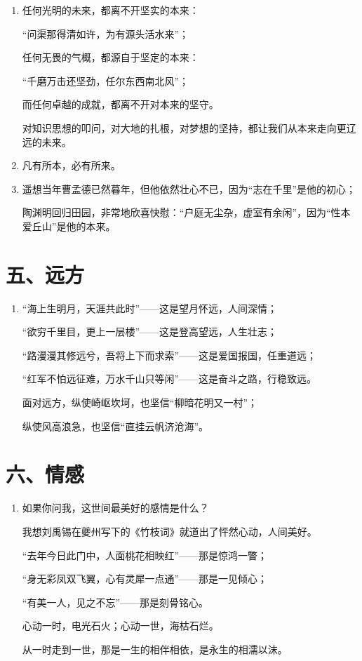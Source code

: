 \begin{enumerate}[leftmargin=*]
    \item 任何光明的未来，都离不开坚实的本来：
    
    “问渠那得清如许，为有源头活水来”；
    
    任何无畏的气概，都源自于坚定的本来：
    
    “千磨万击还坚劲，任尔东西南北风”；
    
    而任何卓越的成就，都离不开对本来的坚守。
    
    对知识思想的叩问，对大地的扎根，对梦想的坚持，都让我们从本来走向更辽远的未来。
    
    \item 凡有所本，必有所来。
    
    \item 遥想当年曹孟德已然暮年，但他依然壮心不已，因为“志在千里”是他的初心；
    
    陶渊明回归田园，非常地欣喜快慰：“户庭无尘杂，虚室有余闲”，因为“性本爱丘山”是他的本来。
\end{enumerate}

\newpage

\section*{五、远方}

\begin{enumerate}[leftmargin=*]
    \item “海上生明月，天涯共此时”——这是望月怀远，人间深情；
    
    “欲穷千里目，更上一层楼”——这是登高望远，人生壮志；
    
    “路漫漫其修远兮，吾将上下而求索”——这是爱国报国，任重道远；
    
    “红军不怕远征难，万水千山只等闲”——这是奋斗之路，行稳致远。
    
    面对远方，纵使崎岖坎坷，也坚信“柳暗花明又一村”；
    
    纵使风高浪急，也坚信“直挂云帆济沧海”。
\end{enumerate}

\newpage

\section*{六、情感}

\begin{enumerate}[leftmargin=*]
    \item 如果你问我，这世间最美好的感情是什么？
    
    我想刘禹锡在夔州写下的《竹枝词》就道出了怦然心动，人间美好。
    
    “去年今日此门中，人面桃花相映红”——那是惊鸿一瞥；
    
    “身无彩凤双飞翼，心有灵犀一点通”——那是一见倾心；
    
    “有美一人，见之不忘”——那是刻骨铭心。
    
    心动一时，电光石火；心动一世，海枯石烂。
    
    从一时走到一世，那是一生的相伴相依，是永生的相濡以沫。
\end{enumerate}

